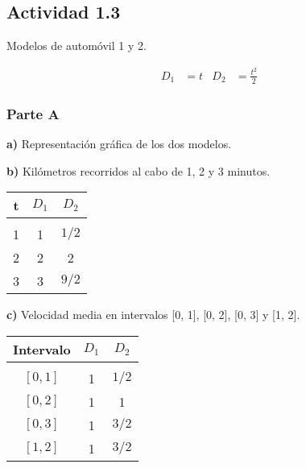 \subsection*{Actividad 1.3}

Modelos de automóvil 1 y 2.

\begin{align*}
    D_1 &= t &
    D_2 &= \frac{t^2}{2}
\end{align*}

\subsubsection*{Parte A}

\textbf{a)} Representación gráfica de los dos modelos.

\begin{center}
\end{center}

\textbf{b)} Kilómetros recorridos al cabo de 1, 2 y 3 minutos.

\begin{center}
\begin{tabular}{ c c c }
	t	&	$D_1$  &   $D_2$  \\
	\hline \\
	1	&	1     &   $1/2$\\	
	2	&	2     &   2\\	
	3	&	3     &   $9/2$\\
    \hline
\end{tabular}
\end{center}

\textbf{c)} Velocidad media en intervalos [0, 1], [0, 2], [0, 3] y [1, 2].

\begin{center}
\begin{tabular}{ c c c }
	Intervalo	&	$D_1$  &   $D_2$ \\
	\hline \\
	$[0, 1]$    &	 1     &   $1/2$ \\	
	$[0, 2]$    &	 1     &   1     \\	
	$[0, 3]$    &	 1     &   $3/2$ \\
    $[1, 2]$    &    1     &   $3/2$ \\
    \hline
\end{tabular}
\end{center}

